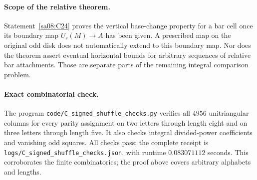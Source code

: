 \paragraph{Scope of the relative theorem.}
Statement~\ref{sa08:C24} proves the vertical base-change property
for a bar cell once its boundary map $U_r(M)\to A$ has been
given. A prescribed map on the original odd disk does not
automatically extend to this boundary map. Nor does the theorem
assert eventual horizontal bounds for arbitrary sequences of
relative bar attachments. Those are separate parts of the
remaining integral comparison problem.

\paragraph{Exact combinatorial check.}
The program \texttt{code/C\_signed\_shuffle\_checks.py} verifies
all $4956$ unitriangular columns for every parity assignment on
two letters through length eight and on three letters through
length five. It also checks integral divided-power coefficients
and vanishing odd squares. All checks pass; the complete receipt
is \texttt{logs/C\_signed\_shuffle\_checks.json}, with runtime
$0.083071112$ seconds. This corroborates the finite combinatorics;
the proof above covers arbitrary alphabets and lengths.
